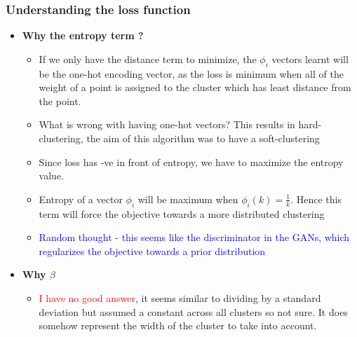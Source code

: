 \documentclass{article}
\newcommand{\red}[1]{\textcolor{red}{#1}}
\newcommand{\blue}[1]{\textcolor{blue}{#1}}
\begin{document}
\subsubsection{Understanding the loss function}
\begin{itemize}
    \item \textbf{Why the entropy term ?}
        \begin{itemize}
            \item If we only have the distance term to minimize, the $\phi_i$ vectors learnt will be the one-hot encoding vector, as the loss is minimum when all of the weight of a point is assigned to the cluster which has least distance from the point.
            \item What is wrong with having one-hot vectors? This results in hard-clustering, the aim of this algorithm was to have a soft-clustering
            \item Since loss has -ve in front of entropy, we have to maximize the entropy value.
            \item Entropy of a vector $\phi_i$ will be maximum when $\phi_i(k)=\frac{1}{k}$. Hence this term will force the objective towards a more distributed clustering
            \item \blue{Random thought - this seems like the discriminator in the GANs, which regularizes the objective towards a prior distribution}
        \end{itemize}
    \item \textbf{Why $\beta$}
        \begin{itemize}
            \item \red{I have no good answer}, it seems similar to dividing by a standard deviation but assumed a constant across all clusters so not sure. It does somehow represent the width of the cluster to take into account.
        \end{itemize}
\end{itemize}
\end{document}
